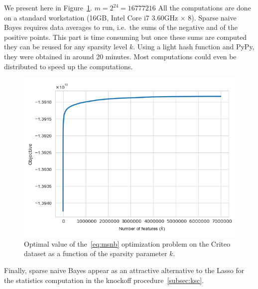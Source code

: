 We present here in Figure~\ref{fig:criteo_hash_elbow}.
$m = 2^{24} = 16777216$
All the computations are done on a standard workstation (16GB, Intel Core i7 3.60GHz $\times$ 8).
Sparse naive Bayes requires data averages to run,
i.e.\ the sums of the negative and of the positive points.
This part is time consuming but once these sums are computed they can be reused for any sparsity level $k$.
Using a light hash function and PyPy, they were obtained in around 20 minutes.
Most computations could even be distributed to speed up the computations.
\begin{figure}
    \centering
    \includegraphics[width=0.75\linewidth, height=0.4\linewidth]{figures/criteo_hash_elbow.png}
    \caption{
        Optimal value of the~\ref{eq:msnb} optimization problem on the Criteo dataset
        as a function of the sparsity parameter $k$.
    }
    \label{fig:criteo_hash_elbow}
\end{figure}

\bigbreak
Finally, sparse naive Bayes appear as an attractive alternative to the Lasso for the statistics computation
in the knockoff procedure~\ref{subsec:ksc}.
